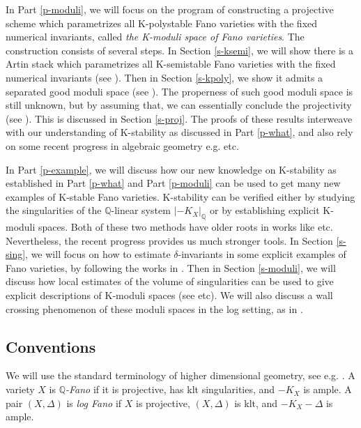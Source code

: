 \documentclass[12pt,reqno]{amsart}%
\theoremstyle{definition}
\theoremstyle{remark}
\begin{document}
In Part \ref{p-moduli}, we will focus on the program of constructing a projective scheme which parametrizes all K-polystable Fano varieties with the fixed numerical invariants, called {\it the K-moduli space  of Fano varieties}. 
The construction consists of several steps. In Section \ref{s-ksemi}, we will show there is a Artin stack which parametrizes all K-semistable Fano varieties with the fixed numerical invariants (see \cite{Jia17, BLX19, Xu19, XZ20}). Then in Section \ref{s-kpoly}, we show it admits a separated good moduli space (see \cite{BX19, ABHX19}). The properness of such good moduli space is still unknown, but by assuming that, we can essentially conclude the projectivity (see \cite{CP18, XZ19}). This is discussed in Section \ref{s-proj}. The proofs of these results interweave with our understanding of K-stability as discussed in Part \ref{p-what}, and also rely on some recent progress in algebraic geometry e.g. \cite{HMX14, Bir19, AHH18} etc.


\medskip

In Part \ref{p-example}, we will discuss how our new knowledge on K-stability as established in Part \ref{p-what} and Part \ref{p-moduli} can be used to get many new  examples of K-stable Fano varieties. K-stability can be verified either by studying the singularities of the $\mathbb{Q}$-linear system $|-K_X|_{\mathbb{Q}}$ or by establishing explicit  K-moduli spaces. Both of these two methods have older roots in works like \cite{Tia87,Tia90,MM93, OSS16} etc. Nevertheless, the recent progress provides us much stronger tools. In Section \ref{s-sing}, we will focus on how to estimate $\delta$-invariants in some explicit examples of Fano varieties, by following the works in \cite{Fuj19, SZ19, AZ20}. Then in Section \ref{s-moduli}, we will discuss how local estimates of the volume of singularities can be used to give explicit descriptions of K-moduli spaces (see \cite{LX19, Liu20,ADL19} etc). We will also discuss a wall crossing phenomenon of these moduli spaces in the log setting, as in \cite{ADL19}. 



\subsection{Conventions} We will use the standard terminology of higher dimensional geometry, see e.g. \cite{KM98, Kol13, Laz04}.  A variety $X$ is {\it $\mathbb{Q}$-Fano} if it is projective, has klt singularities, and $-K_X$ is ample. 
A pair $(X,\Delta)$ is {\it log Fano} if $X$ is projective, $(X,\Delta)$ is klt, and $-K_X-\Delta$ is ample. 
\end{document}
